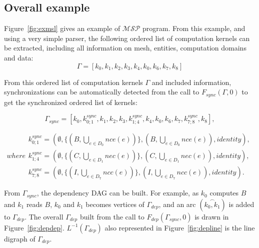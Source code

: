 \subsection{Overall example}

Figure~\ref{fig:exmsl} gives an example of $\mathcal{MSP}$ program. From this example, and using a very simple parser, the following ordered list of computation kernels can be extracted, including all information on mesh, entities, computation domains and data:
\begin{equation*}
\Gamma = [k_0,k_1,k_2,k_3,k_4,k_0,k_6,k_7,k_8]
\end{equation*}

From this ordered list of computation kernels $\Gamma$ and included information, synchronizations can be automatically detected from the call to $F_{sync}(\Gamma,0)$ to get the synchronized ordered list of kernels:

\begin{equation*}
\Gamma_{sync} = [k_0,k_{0;1}^{sync},k_1,k_2,k_3,k_{1;4}^{sync},k_4,k_0,k_6,k_7,k_{7;8}^{sync},k_8],
\end{equation*}

\begin{subequations}
where
\begin{align}
        k_{0;1}^{sync}=(\emptyset,\{(B,\bigcup_{e \in D_0} nce(e))\},(B,\bigcup_{e \in D_0} nce(e)),identity),\\
        k_{1;4}^{sync}=(\emptyset,\{(C,\bigcup_{e \in D_1} nec(e))\},(C,\bigcup_{e \in D_1} nec(e)),identity),\\
        k_{7;8}^{sync}=(\emptyset,\{(I,\bigcup_{e \in D_7} ncc(e))\},(I,\bigcup_{e \in D_7} ncc(e)),identity).
\end{align}
\end{subequations}

From $\Gamma_{sync}$, the dependency DAG can be built. For example, as $k_0$ computes $B$ and $k_1$ reads $B$, $k_0$ and $k_1$ becomes vertices of $\Gamma_{dep}$, and an arc $(\overset{\frown}{k_0,k_1})$ is added to $\Gamma_{dep}$. The overall $\Gamma_{dep}$ built from the call to $F_{dep}(\Gamma_{sync},0)$ is drawn in Figure~\ref{fig:depdep}. $L^{-1}(\Gamma_{dep})$ also represented in Figure~\ref{fig:depline} is the line digraph of $\Gamma_{dep}$.


